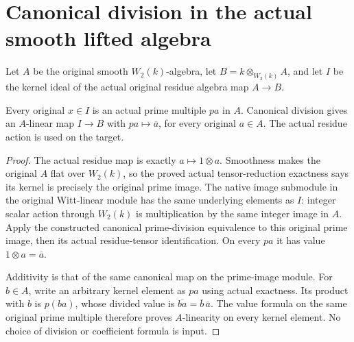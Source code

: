 \section{Canonical division in the actual smooth lifted algebra}
\label{sec:witt-two-algebra-division}

Let $A$ be the original smooth $W_2(k)$-algebra, let
$B=k\otimes_{W_2(k)}A$, and let $I$ be the kernel ideal of the actual
original residue algebra map $A\to B$.

\begin{theorem}
\label{thm:witt-two-algebra-kernel-division}
\leanok
{}
Every original $x\in I$ is an actual prime multiple $pa$ in $A$.
Canonical division gives an $A$-linear map $I\to B$ with
$pa\mapsto\overline a$, for every original $a\in A$.
The actual residue action is used on the target.
\end{theorem}
\begin{proof}
The actual residue map is exactly $a\mapsto1\otimes a$.
Smoothness makes the original $A$ flat over $W_2(k)$, so the proved
actual tensor-reduction exactness says its kernel is precisely the
original prime image. The native image submodule in the original
Witt-linear module has the same underlying elements as $I$:
integer scalar action through $W_2(k)$ is multiplication by the same
integer image in $A$. Apply the constructed canonical
prime-division equivalence to this original prime image, then its
actual residue-tensor identification. On every $pa$ it has value
$1\otimes a=\overline a$.

Additivity is that of the same canonical map on the prime-image module.
For $b\in A$, write an arbitrary kernel element as $pa$ using actual
exactness. Its product with $b$ is $p(ba)$, whose divided value is
$\overline{ba}=\overline b\,\overline a$. The value formula on the
same original prime multiple therefore proves $A$-linearity on every
kernel element. No choice of division or coefficient formula is input.
\end{proof}

